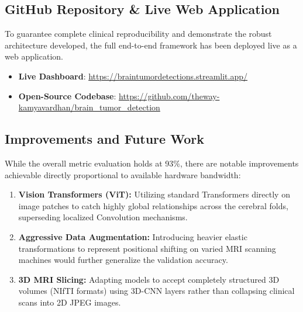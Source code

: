 \documentclass[12pt, a4paper]{article}
\begin{document}
\subsection*{GitHub Repository \& Live Web Application}

To guarantee complete clinical reproducibility and demonstrate the robust architecture developed, the full end-to-end framework has been deployed live as a web application.

\begin{itemize}
    \item \textbf{Live Dashboard}: \url{https://braintumordetections.streamlit.app/}
    \item \textbf{Open-Source Codebase}: \url{https://github.com/theway-kamyavardhan/brain_tumor_detection}
\end{itemize}

\subsection*{Improvements and Future Work}
While the overall metric evaluation holds at 93\%, there are notable improvements achievable directly proportional to available hardware bandwidth:
\begin{enumerate}
    \item \textbf{Vision Transformers (ViT):} Utilizing standard Transformers directly on image patches to catch highly global relationships across the cerebral folds, superseding localized Convolution mechanisms.
    \item \textbf{Aggressive Data Augmentation:} Introducing heavier elastic transformations to represent positional shifting on varied MRI scanning machines would further generalize the validation accuracy.
    \item \textbf{3D MRI Slicing:} Adapting models to accept completely structured 3D volumes (NIfTI formats) using 3D-CNN layers rather than collapsing clinical scans into 2D JPEG images.
\end{enumerate}
\end{document}
